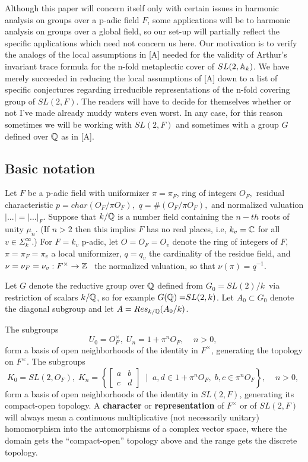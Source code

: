 Although this paper will concern itself only with certain issues in harmonic
analysis on groups over a p-adic field $F$, some applications will be to
harmonic analysis on groups over a global field, so our set-up will
partially reflect the specific applications which need not concern us here.
Our motivation is to verify the analogs of the local assumptions in [A]
needed for the validity of Arthur's invariant trace formula for the n-fold
metaplectic cover of $SL(2,{\Bbb A}_k)$. We have merely succeeded in
reducing the local assumptions of [A] down to a list of specific conjectures
regarding irreducible representations of the n-fold covering group of $%
SL(2,F)$. The readers will have to decide for themselves whether or not I've
made already muddy waters even worst. In any case, for this reason sometimes
we will be working with $SL(2,F)$ and sometimes with a group $G$ defined
over ${\Bbb Q}$ as in [A].


\subsection{Basic notation}

Let $F$ be a p-adic field with uniformizer $\pi =\pi _F$, ring of integers $%
O_F,$ residual characteristic $p=char(O_F/\pi O_F),$ $q=\#(O_F/\pi O_F),$
and normalized valuation $|...|=|...|_F.$ Suppose that $k/{\Bbb Q}$ is a
number field containing the $n-th$ roots of unity $\mu _n$. (If $n>2$ then
this implies $F$ has no real places, i.e, $k_v={\Bbb C}$ for all $v\in
\Sigma _k^\infty $.) For $F=k_v$ p-adic, let $O=O_F=O_v$ denote the ring of
integers of $F$, $\pi =\pi _F=\pi _v$ a local uniformizer, $q=q_v$ the
cardinality of the residue field, and $\nu =\nu _F=\nu _v:F^{\times
}\rightarrow {\Bbb {Z}}$ \ the normalized valuation, so that $\nu (\pi
)=q^{-1}$.

Let $G$ denote the reductive group over ${\Bbb {Q}}$ defined from $%
G_0=SL(2)/k$\ via restriction of scalars $k/{\Bbb {Q}}$, so for example $G(%
{\Bbb {Q})=}SL(2,k)$. Let $A_0\subset G_0$ denote the diagonal subgroup and
let $A=Res_{k/{\Bbb Q}}(A_0/k)$.

The subgroups 
\[
U_0=O_F^{\times },\;U_n=1+\pi ^nO_F,\;\;\;\;n>0,\; 
\]
form a basis of open neighborhoods of the identity in $F^{\times }$,
generating the topology on $F^{\times }$. The subgroups 
\[
K_0=SL(2,O_F),\;K_n=\left\{ \left[ 
\begin{array}{cc}
a & b \\ 
c & d
\end{array}
\right] \;\;|\;\;a,d\in 1+\pi ^nO_F,\;b,c\in \pi ^nO_F\right\}
,\;\;\;\;n>0,\; 
\]
form a basis of open neighborhoods of the identity in $SL(2,F)$, generating
its compact-open topology. A {\bf character} or {\bf representation} of $%
F^{\times }$ or of $SL(2,F)$ will always mean a continuous multiplicative
(not necessarily unitary) homomorphism into the automorphisms of a complex
vector space, where the domain gets the ``compact-open'' topology above and
the range gets the discrete topology.

